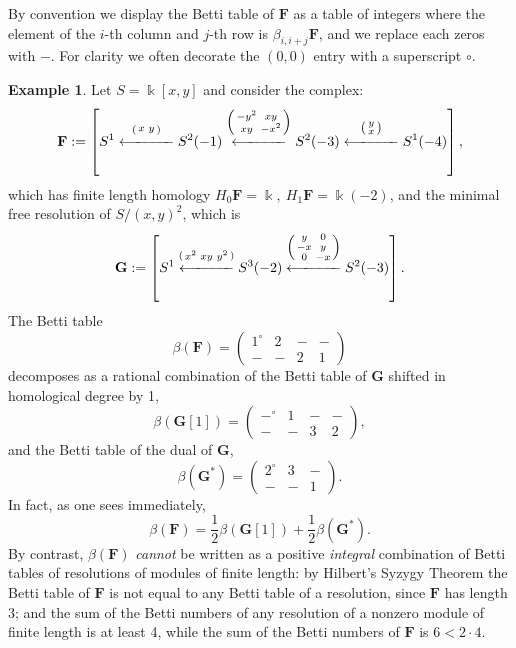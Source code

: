 \documentclass[12pt]{amsart}
\theoremstyle{definition}
\newtheorem{example}[lemma]{Example}
\theoremstyle{remark}
\newcommand{\kk}{\Bbbk}
\newcommand{\bG}{\mathbf{G}}
\newcommand{\FF}{\mathbf{F}}
\begin{document}
By convention we display the Betti table of $\FF$ as a table
of integers where the element of the $i$-th column and $j$-th row is $\beta_{i,i+j}\FF$, and we replace each zeros with $-$. For clarity we often decorate the $(0,0)$ entry
with a superscript $\circ$.

\begin{example}
Let $S=\kk[x,y]$ and consider the complex:
\[
\FF := \left[S^1\overset{\left(\begin{smallmatrix}x&y\end{smallmatrix}\right)}{\xlongleftarrow{\hspace*{1.1cm}}} S^2(-1)\overset{\left(\begin{smallmatrix}-y^2&xy\\xy&-x^2\end{smallmatrix}\right)}{\xlongleftarrow{\hspace*{1.1cm}}} S^2(-3)\overset{\left(\begin{smallmatrix}y\\x\end{smallmatrix}\right)}{\xlongleftarrow{\hspace*{1.1cm}}} S^1(-4)\right],
\]
which has finite length homology $H_{0}\FF = \kk,\ H_{1}\FF = \kk(-2)$, and the minimal free resolution of $S/(x,y)^{2}$, which 
is
\[
\bG := 
\left[S^1\overset{\left(\begin{smallmatrix}x^{2}&xy&y^{2}\end{smallmatrix}\right)}
{\xlongleftarrow{\hspace*{1.1cm}}} 
S^3(-2)\overset{\left(\begin{smallmatrix}y&0\\-x&y\\0&-x\end{smallmatrix}\right)}{\xlongleftarrow{\hspace*{1.1cm}}} S^2(-3)\right].
\]
The Betti table
$$
\beta(\FF)=\begin{pmatrix} 1^\circ&2&-&-\\-&-&2&1\end{pmatrix}
$$
decomposes as a rational combination of the Betti table of $\bG$ shifted in 
homological degree by 1,
$$
\beta(\bG[1]) =\begin{pmatrix} -^{\circ}&1&-&-\\-&-&3&2\end{pmatrix},
$$
and the Betti table of the dual of $\bG$, 
$$
\beta(\bG^{*}) = \begin{pmatrix} 2^\circ&3&-\\-&-&1\end{pmatrix}.
$$
In fact, as one sees immediately,
\[
\beta(\FF)=
\frac{1}{2}\beta(\bG[1])
+
\frac{1}{2}\beta(\bG^{*}).
\]
By contrast, $\beta(\FF)$ \emph{cannot} be written as a positive \emph{integral} combination of Betti tables of resolutions of modules of finite length: by Hilbert's Syzygy Theorem the Betti table of $\FF$  is not equal to any Betti table of a resolution, since $\FF$ has length 3; and the sum of the Betti numbers of any resolution of a nonzero module of finite length is at least 4, while the sum of the Betti numbers of $\FF$ is $6<2\cdot 4$.
\end{example}
\end{document}
